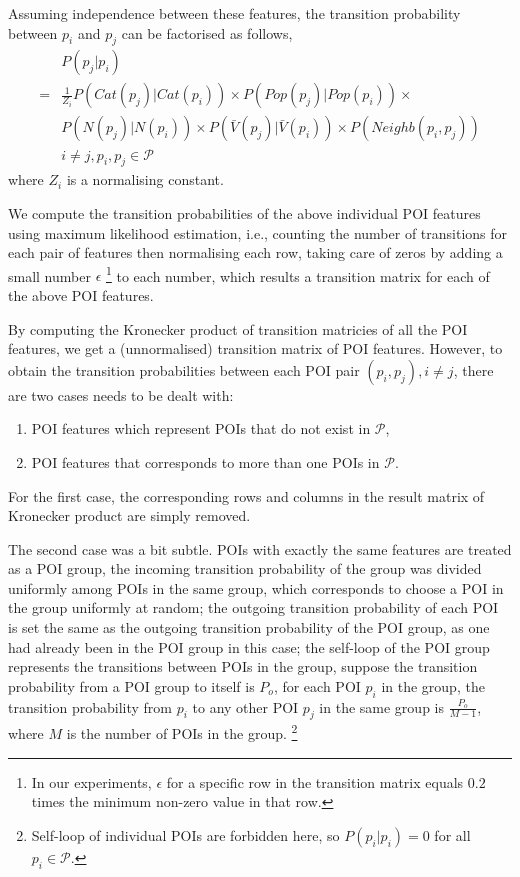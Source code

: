 \documentclass{sig-alternate-05-2015}
\begin{document}
Assuming independence between these features,
the transition probability between $p_i$ and $p_j$ can be factorised as follows,
\begin{align*}
    & P(p_j | p_i) \\
   =& \frac{1}{Z_i} P(Cat(p_j) | Cat(p_i)) \times P(Pop(p_j) | Pop(p_i)) \times \\
    & P(N(p_j) | N(p_i)) \times P(\bar{V}(p_j) | \bar{V}(p_i)) \times P(Neighb(p_i, p_j)) \\
    & i \ne j, p_i, p_j \in \mathcal{P}
\end{align*}
where $Z_i$ is a normalising constant.


We compute the transition probabilities of the above individual POI features 
using maximum likelihood estimation, 
i.e., counting the number of transitions for each pair of features then normalising each row,
taking care of zeros by adding a small number $\epsilon$
\footnote{In our experiments, $\epsilon$ for a specific row in the transition matrix equals $0.2$ times 
the minimum non-zero value in that row.}
to each number,
which results a transition matrix for each of the above POI features.

By computing the Kronecker product of transition matricies of all the POI features,
we get a (unnormalised) transition matrix of POI features.
However, to obtain the transition probabilities between each POI pair $(p_i, p_j), i \ne j$,
there are two cases needs to be dealt with:
\begin{enumerate}
\item POI features which represent POIs that do not exist in $\mathcal{P}$,
\item POI features that corresponds to more than one POIs in $\mathcal{P}$.
\end{enumerate}

For the first case, 
the corresponding rows and columns in the result matrix of Kronecker product are simply removed.

The second case was a bit subtle.
POIs with exactly the same features are treated as a POI group,
the incoming transition probability of the group was divided uniformly among POIs in the same group,
which corresponds to choose a POI in the group uniformly at random;
the outgoing transition probability of each POI is set the same as the outgoing transition probability of the POI group,
as one had already been in the POI group in this case;
the self-loop of the POI group represents the transitions between POIs in the group,
suppose the transition probability from a POI group to itself is $P_o$,
for each POI $p_i$ in the group, the transition probability from $p_i$ to any other POI $p_j$ in the same group
is $\frac{P_o}{M-1}$, where $M$ is the number of POIs in the group.
\footnote{Self-loop of individual POIs are forbidden here, so $P(p_i | p_i) = 0$ for all $p_i \in \mathcal{P}$.}
\end{document}
